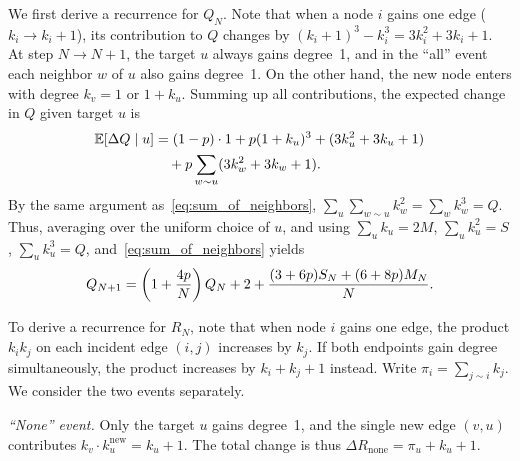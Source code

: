 \documentclass[aps,pre,twocolumn,showpacs,preprintnumbers]{revtex4-2}
\newcommand*{\E}{\mathbb{E}}
\begin{document}
We first derive a recurrence for $Q_N$. Note that when a node $i$ gains one edge ($k_i\to k_i+1$), its contribution to $Q$ changes by $(k_i+1)^3-k_i^3=3k_i^2+3k_i+1$. At step $N\to N+1$, the target $u$ always gains degree~1, and in the ``all'' event each neighbor $w$ of $u$ also gains degree~1. On the other hand, the new node enters with degree $k_v=1$ or $1+k_u$. Summing up all contributions, the expected change in $Q$ given target $u$ is
\begin{align}
  \E[\Delta Q\mid u] &= (1-p)\cdot 1 + p(1+k_u)^3 + (3k_u^2+3k_u+1) \notag \\
  &\quad+ p\sum_{w\sim u}(3k_w^2+3k_w+1). \notag
\end{align}
By the same argument as~\eqref{eq:sum_of_neighbors}, $\sum_u\sum_{w\sim u}k_w^2 = \sum_w k_w^3 = Q$. Thus, averaging over the uniform choice of $u$, and using $\sum_u k_u = 2M$, $\sum_u k_u^2 = S$, $\sum_u k_u^3 = Q$, and~\eqref{eq:sum_of_neighbors} yields
\begin{equation}\label{eq:Q_rec}
  Q_{N+1} = \left(1+\frac{4p}{N}\right)Q_N+2+\frac{(3+6p)S_N+(6+8p)M_N}{N}. \notag
\end{equation}

To derive a recurrence for $R_N$, note that when node $i$ gains one edge, the product $k_ik_j$ on each incident edge $(i,j)$ increases by $k_j$. If both endpoints gain degree simultaneously, the product increases by $k_i+k_j+1$ instead. Write $\pi_i = \sum_{j\sim i}k_j$. We consider the two events separately.

\emph{``None'' event.} Only the target $u$ gains degree~1, and the single new edge $(v,u)$ contributes $k_v\cdot k_u^{\mathrm{new}}=k_u+1$. The total change is thus $\Delta R_{\mathrm{none}} = \pi_u + k_u + 1$.
\end{document}
